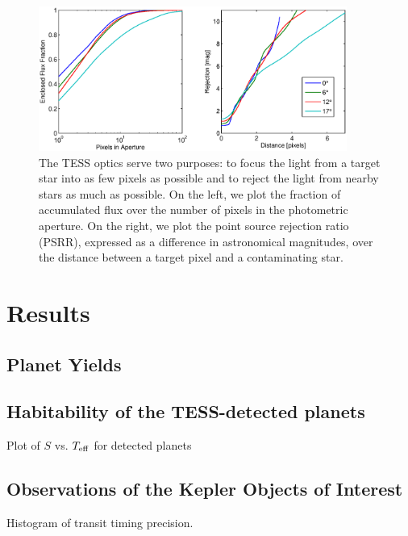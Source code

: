 \documentclass[preprint]{aastex}
\def \teff {T_{\rm eff}}
\begin{document}
\begin{figure}[hbtp]
\begin{center}
\includegraphics[width=0.9\textwidth]{npix.eps}
\caption{The TESS optics serve two purposes: to focus the light from a target star into as few pixels as possible and to reject the light from nearby stars as much as possible. On the left, we plot the fraction of accumulated flux over the number of pixels in the photometric aperture. On the right, we plot the point source rejection ratio (PSRR), expressed as a difference in astronomical magnitudes, over the distance between a target pixel and a contaminating star.}
\end{center}
\end{figure}

\section{Results}
\subsection{Planet Yields}
\subsection{Habitability of the TESS-detected planets}
Plot of $S$ vs. $\teff$ for detected planets
\subsection{Observations of the Kepler Objects of Interest}
Histogram of transit timing precision.
\end{document}
